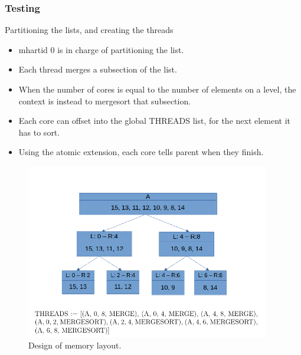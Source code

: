 \begin{frame}[hoved]
	\frametitle{Testing}
	\begin{minipage}[t]{0.45\textwidth}
		{\large Partitioning the lists, and creating the threads}
		\begin{itemize}
			\item mhartid 0 is in charge of partitioning the list.
			\item Each thread merges a subsection of the list.
			\item When the number of cores is equal to the number of elements on a
			      level, the context is instead to mergesort that subsection.
			\item Each core can offset into the global THREADS list, for the next
			      element it has to sort.
			\item Using the atomic extension, each core tells parent when they finish.
		\end{itemize}
	\end{minipage}
	\hfill
	\begin{minipage}[t]{0.45\textwidth}
		\begin{figure}
			\begin{center}
				\includegraphics[width=0.95\textwidth]{figures/partitioning.png}
			\end{center}
			\caption{Design of memory layout.}\label{fig:partition}
		\end{figure}
	\end{minipage}
\end{frame}
